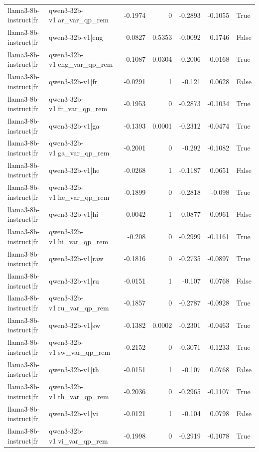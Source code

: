 \begin{table}
\begin{tabular}{l l r r r r l}
llama3-8b-instruct|fr & qwen3-32b-v1|ar_var_qp_rem & -0.1974 & 0 & -0.2893 & -0.1055 & True \\
llama3-8b-instruct|fr & qwen3-32b-v1|eng & 0.0827 & 0.5353 & -0.0092 & 0.1746 & False \\
llama3-8b-instruct|fr & qwen3-32b-v1|eng_var_qp_rem & -0.1087 & 0.0304 & -0.2006 & -0.0168 & True \\
llama3-8b-instruct|fr & qwen3-32b-v1|fr & -0.0291 & 1 & -0.121 & 0.0628 & False \\
llama3-8b-instruct|fr & qwen3-32b-v1|fr_var_qp_rem & -0.1953 & 0 & -0.2873 & -0.1034 & True \\
llama3-8b-instruct|fr & qwen3-32b-v1|ga & -0.1393 & 0.0001 & -0.2312 & -0.0474 & True \\
llama3-8b-instruct|fr & qwen3-32b-v1|ga_var_qp_rem & -0.2001 & 0 & -0.292 & -0.1082 & True \\
llama3-8b-instruct|fr & qwen3-32b-v1|he & -0.0268 & 1 & -0.1187 & 0.0651 & False \\
llama3-8b-instruct|fr & qwen3-32b-v1|he_var_qp_rem & -0.1899 & 0 & -0.2818 & -0.098 & True \\
llama3-8b-instruct|fr & qwen3-32b-v1|hi & 0.0042 & 1 & -0.0877 & 0.0961 & False \\
llama3-8b-instruct|fr & qwen3-32b-v1|hi_var_qp_rem & -0.208 & 0 & -0.2999 & -0.1161 & True \\
llama3-8b-instruct|fr & qwen3-32b-v1|raw & -0.1816 & 0 & -0.2735 & -0.0897 & True \\
llama3-8b-instruct|fr & qwen3-32b-v1|ru & -0.0151 & 1 & -0.107 & 0.0768 & False \\
llama3-8b-instruct|fr & qwen3-32b-v1|ru_var_qp_rem & -0.1857 & 0 & -0.2787 & -0.0928 & True \\
llama3-8b-instruct|fr & qwen3-32b-v1|sw & -0.1382 & 0.0002 & -0.2301 & -0.0463 & True \\
llama3-8b-instruct|fr & qwen3-32b-v1|sw_var_qp_rem & -0.2152 & 0 & -0.3071 & -0.1233 & True \\
llama3-8b-instruct|fr & qwen3-32b-v1|th & -0.0151 & 1 & -0.107 & 0.0768 & False \\
llama3-8b-instruct|fr & qwen3-32b-v1|th_var_qp_rem & -0.2036 & 0 & -0.2965 & -0.1107 & True \\
llama3-8b-instruct|fr & qwen3-32b-v1|vi & -0.0121 & 1 & -0.104 & 0.0798 & False \\
llama3-8b-instruct|fr & qwen3-32b-v1|vi_var_qp_rem & -0.1998 & 0 & -0.2919 & -0.1078 & True \\

\end{tabular}
\end{table}
